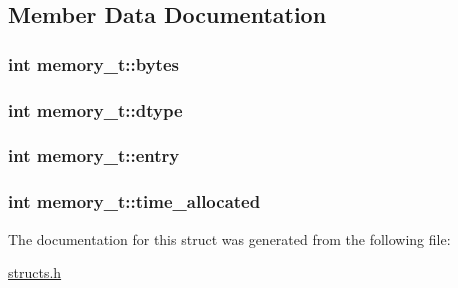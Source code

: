 \subsection{Member Data Documentation}
\hypertarget{structmemory__t_aa76ff43845139d4f10ab1c42312f9283}{
\subsubsection[{bytes}]{\setlength{\rightskip}{0pt plus 5cm}int memory\-\_\-t\-::bytes}}\label{structmemory__t_aa76ff43845139d4f10ab1c42312f9283}
\hypertarget{structmemory__t_afe67a9517ec96c3fd688b4e966fab07f}{
\subsubsection[{dtype}]{\setlength{\rightskip}{0pt plus 5cm}int memory\-\_\-t\-::dtype}}\label{structmemory__t_afe67a9517ec96c3fd688b4e966fab07f}
\hypertarget{structmemory__t_a986bfd57925f4a00654d7a18d7dc81c3}{
\subsubsection[{entry}]{\setlength{\rightskip}{0pt plus 5cm}int memory\-\_\-t\-::entry}}\label{structmemory__t_a986bfd57925f4a00654d7a18d7dc81c3}
\hypertarget{structmemory__t_a3e9a0e482bd948492bef419b545d3580}{
\subsubsection[{time\-\_\-allocated}]{\setlength{\rightskip}{0pt plus 5cm}int memory\-\_\-t\-::time\-\_\-allocated}}\label{structmemory__t_a3e9a0e482bd948492bef419b545d3580}


The documentation for this struct was generated from the following file\-:\begin{DoxyCompactItemize}
\item 
\hyperlink{structs_8h}{structs.\-h}\end{DoxyCompactItemize}
